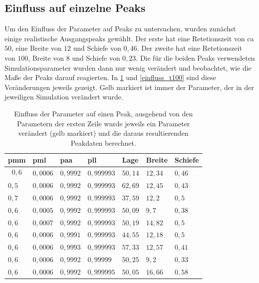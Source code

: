 
\subsection{Einfluss auf einzelne Peaks}
Um den Einfluss der Parameter auf Peaks zu untersuchen, wurden zunächst einige realistische Ausgangspeaks gewählt. Der erste hat eine Retetionszeit von ca $50$, eine Breite von $12$ und Schiefe von $0,46$. Der zweite hat eine Retetionszeit von $100$, Breite von $8$ und Schiefe von $0,23$.
Die für die beiden Peaks verwendeten Simulationsparameter wurden dann nur wenig verändert und beobachtet, wie die Maße der Peaks darauf reagierten. In \ref{einfluss_t50} und \ref{einfluss_t100} sind diese Veränderungen jeweils gezeigt. Gelb markiert ist immer der Parameter, der in der jeweiligen Simulation verändert wurde.

\begin{table}[h]
\centering
\caption[Einfluss auf einen Peak (1)]{Einfluss der Parameter auf einen Peak, ausgehend von den Parametern der ersten Zeile wurde jeweils ein Parameter verändert (gelb markiert) und die daraus resultierenden Peakdaten berechnet.}
\label{einfluss_t50}
\begin{tabular}{|l|l|l|l||l|l|l|}
\hline
pmm & pml    & paa    & pll      & Lage  & Breite & Schiefe \\ \hline \hline
$$0,6$$ & $0,0006$ & $0,9992$ & $0,999993$ & $50,14$ & $12,34$  & $0,46$    \\ \hline \hline
\cellcolor{yellow} $0,5$ & $0,0006$ & $0,9992$ & $0,999993$ & $62,69$ & $12,45$  & $0,43$    \\ \hline
\cellcolor{yellow} $0,7$ & $0,0006$ & $0,9992$ & $0,999993$ & $37,59$ & $12,2$   & $0,5$     \\ \hline
$0,6$ & \cellcolor{yellow} $0,0005$ & $0,9992$ & $0,999993$ & $50,09$ & $9,7$    & $0,38$    \\ \hline
$0,6$ & \cellcolor{yellow} $0,0007$ & $0,9992$ & $0,999993$ & $50,19$ & $14,82$  & $0,5$     \\ \hline
$0,6$ & $0,0006$ & \cellcolor{yellow} $0,9991$ & $0,999993$ & $44,55$ & $12,18$  & $0,5$     \\ \hline
$0,6$ & $0,0006$ & \cellcolor{yellow} $0,9993$ & $0,999993$ & $57,33$ & $12,57$  & $0,41$    \\ \hline
$0,6$ & $0,0006$ & $0,9992$ & \cellcolor{yellow} $0,99999$  & $50,25$ & $9,2$    & $0,33$    \\ \hline
$0,6$ & $0,0006$ & $0,9992$ & \cellcolor{yellow} $0,999995$ & $50,05$ & $16,66$  & $0,58$    \\ \hline
\end{tabular}
\end{table}

